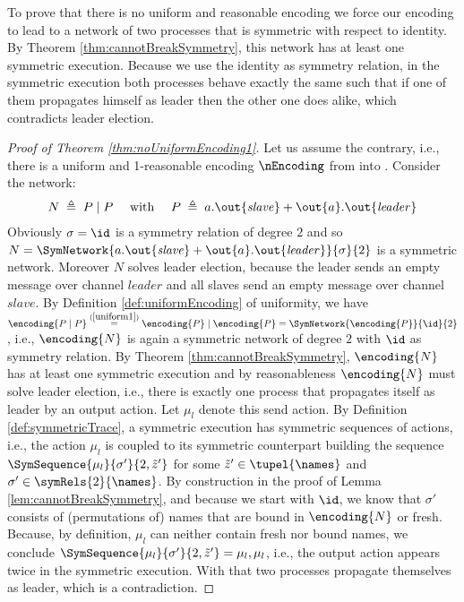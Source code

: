 \documentclass[11pt,techReport]{eptcs}
\begin{document}

To prove that there is no uniform and reasonable encoding we force our encoding to lead to a network of two processes that is symmetric with respect to identity. By Theorem \ref{thm:cannotBreakSymmetry}, this network has at least one symmetric execution. Because we use the identity as symmetry relation, in the symmetric execution both processes behave exactly the same such that if one of them propagates himself as leader then the other one does alike, which contradicts leader election.

\begin{proof}[Proof of Theorem \ref{thm:noUniformEncoding1}]
	Let us assume the contrary, i.e., there is a uniform and 1-reasonable encoding $ \nEncoding $ from \pimix into \pisep. Consider the network:
	\begin{align*}
		N \; \triangleq \; P \mid P \quad \text{ with } \quad P \; \triangleq \; a.\out{\mathit{slave}} + \out{a}.\out{\mathit{leader}}
	\end{align*}
	Obviously $ \sigma = \id $ is a symmetry relation of degree $ 2 $ and so $ N = \SymNetwork{a.\out{\mathit{slave}} + \out{a}.\out{\mathit{leader}}}{\sigma}{2} $ is a symmetric network. Moreover $ N $ solves leader election, because the leader sends an empty message over channel $ \mathit{leader} $ and all slaves send an empty message over channel $ \mathit{slave} $. By Definition \ref{def:uniformEncoding} of uniformity, we have $ \encoding{P \mid P} \stackrel{(\ref{uniform1})}= \encoding{P} \mid \encoding{P} = \SymNetwork{\encoding{P}}{\id}{2} $, i.e., $ \encoding{N} $ is again a symmetric network of degree $ 2 $ with $ \id $ as symmetry relation. By Theorem \ref{thm:cannotBreakSymmetry}, $ \encoding{N} $ has at least one symmetric execution and by reasonableness $ \encoding{N} $ must solve leader election, i.e., there is exactly one process that propagates itself as leader by an output action. Let $ \mu_l $ denote this send action. By Definition \ref{def:symmetricTrace}, a symmetric execution has symmetric sequences of actions, i.e., the action $ \mu_l $ is coupled to its symmetric counterpart building the sequence $ \SymSequence{\mu_l}{\sigma'}{2, \tilde{z}'} $ for some $ \tilde{z}' \in \tupel{\names} $ and $ \sigma' \in \symRels{2}{\names} $. By construction in the proof of Lemma \ref{lem:cannotBreakSymmetry}, and because we start with $ \id $, we know that $ \sigma' $ consists of (permutations of) names that are bound in $ \encoding{N} $ or fresh. Because, by definition, $ \mu_l $ can neither contain fresh nor bound names, we conclude $ \SymSequence{\mu_l}{\sigma'}{2, \tilde{z}'} = \mu_l, \mu_l $, i.e., the output action appears twice in the symmetric execution. With that two processes propagate themselves as leader, which is a contradiction.
\end{proof}
\end{document}
